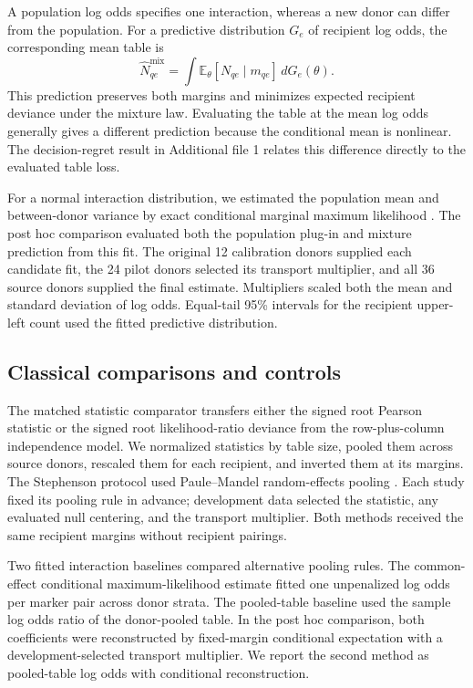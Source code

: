 \documentclass[pdflatex,sn-vancouver-num,iicol]{sn-jnl}
\begin{document}
A population log odds specifies one interaction, whereas a new donor can differ from the population. For a predictive distribution $G_e$ of recipient log odds, the corresponding mean table is
\begin{equation}
  \widehat N_{qe}^{\mathrm{mix}}
  =\int\mathbb E_{\theta}[N_{qe}\mid m_{qe}]\,dG_e(\theta).
  \label{eq:mixture-prediction}
\end{equation}
This prediction preserves both margins and minimizes expected recipient deviance under the mixture law. Evaluating the table at the mean log odds generally gives a different prediction because the conditional mean is nonlinear. The decision-regret result in Additional file 1 relates this difference directly to the evaluated table loss.

For a normal interaction distribution, we estimated the population mean and between-donor variance by exact conditional marginal maximum likelihood \cite{jackson2018}. The post hoc comparison evaluated both the population plug-in and mixture prediction from this fit. The original 12 calibration donors supplied each candidate fit, the 24 pilot donors selected its transport multiplier, and all 36 source donors supplied the final estimate. Multipliers scaled both the mean and standard deviation of log odds. Equal-tail 95\% intervals for the recipient upper-left count used the fitted predictive distribution.

\subsection{Classical comparisons and controls}

The matched statistic comparator transfers either the signed root Pearson statistic or the signed root likelihood-ratio deviance from the row-plus-column independence model. We normalized statistics by table size, pooled them across source donors, rescaled them for each recipient, and inverted them at its margins. The Stephenson protocol used Paule--Mandel random-effects pooling \cite{paule1982}. Each study fixed its pooling rule in advance; development data selected the statistic, any evaluated null centering, and the transport multiplier. Both methods received the same recipient margins without recipient pairings.

Two fitted interaction baselines compared alternative pooling rules. The common-effect conditional maximum-likelihood estimate fitted one unpenalized log odds per marker pair across donor strata. The pooled-table baseline used the sample log odds ratio of the donor-pooled table. In the post hoc comparison, both coefficients were reconstructed by fixed-margin conditional expectation with a development-selected transport multiplier. We report the second method as pooled-table log odds with conditional reconstruction.
\end{document}
